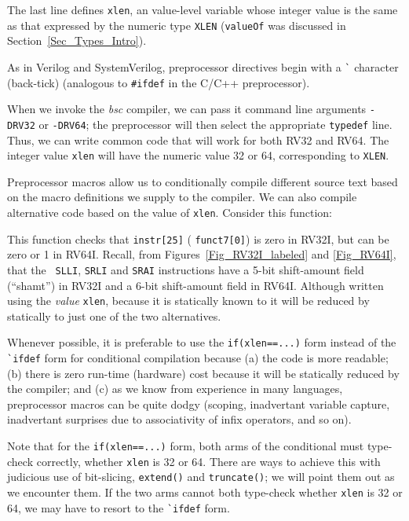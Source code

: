 
The last line defines \verb|xlen|, an value-level variable whose
integer value is the same as that expressed by the numeric type
\verb|XLEN| ({\tt valueOf} was discussed in
Section~\ref{Sec_Types_Intro}).

As in Verilog and SystemVerilog, preprocessor directives begin with a
\verb|`| character (back-tick) (analogous to \verb|#ifdef| in the
C/C++ preprocessor).

When we invoke the \emph{bsc} compiler, we can pass it command line
arguments \verb|-DRV32| or \verb|-DRV64|; the preprocessor will then
select the appropriate \verb|typedef| line.  Thus, we can write common
code that will work for both RV32 and RV64.  The integer value
\verb|xlen| will have the numeric value 32 or 64, corresponding to
{\tt XLEN}.

Preprocessor macros allow us to conditionally compile different source
text based on the macro definitions we supply to the compiler.  We can
also compile alternative code based on the value of \verb|xlen|.
Consider this function:


This function checks that \verb|instr[25]| ({\ie} {\tt funct7[0]}) is
zero in RV32I, but can be zero or 1 in RV64I.  Recall, from
Figures~\ref{Fig_RV32I_labeled} and \ref{Fig_RV64I}, that the {\tt
SLLI}, {\tt SRLI} and {\tt SRAI} instructions have a 5-bit
shift-amount field (``shamt'') in RV32I and a 6-bit shift-amount field
in RV64I.  Although written using the \emph{value} {\tt xlen}, because
it is statically known to {\bsc} it will be reduced by {\bsc}
statically to just one of the two alternatives.

Whenever possible, it is preferable to use the \verb|if(xlen==...)|
form instead of the \verb|`ifdef| form for conditional compilation
because (a) the code is more readable; (b) there is zero run-time
(hardware) cost because it will be statically reduced by the compiler;
and (c) as we know from experience in many languages, preprocessor
macros can be quite dodgy (scoping, inadvertant variable capture,
inadvertant surprises due to associativity of infix operators, and so
on).

Note that for the \verb|if(xlen==...)| form, both arms of the
conditional must type-check correctly, whether \verb|xlen| is 32 or
64.  There are ways to achieve this with judicious use of bit-slicing,
\verb|extend()| and \verb|truncate()|; we will point them out as we
encounter them.  If the two arms cannot both type-check whether
\verb|xlen| is 32 or 64, we may have to resort to the \verb|`ifdef|
form.

